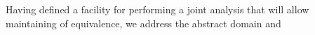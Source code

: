 Having defined a facility for performing a joint analysis that will allow maintaining of equivalence, we address the abstract domain and





